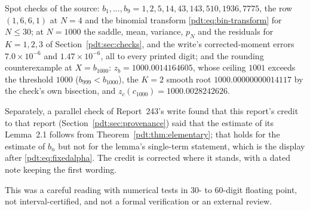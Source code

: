 Spot checks of the source: $b_1,\ldots,b_9=1,2,5,14,43,143,510,1936,7775$,
the row $(1,6,6,1)$ at $N=4$ and the binomial transform
\eqref{pdt:eq:bin-transform} for $N\le30$; at $N=1000$ the saddle, mean,
variance, $p_N$ and the residuals for $K=1,2,3$ of
Section~\ref{pdt:sec:checks}, and the write's corrected-moment errors
$7.0\times10^{-6}$ and $1.47\times10^{-6}$, all to every printed digit; and
the rounding counterexample at $X=b_{1000}$: $z_b=1000.0014164605$, whose
ceiling $1001$ exceeds the threshold $1000$ ($b_{999}<b_{1000}$), the $K=2$
smooth root $1000.00000000014117$ by the check's own bisection, and
$z_c(c_{1000})=1000.0028242626$.

Separately, a parallel check of Report~243's write found that this
report's credit to that report (Section~\ref{pdt:sec:provenance}) said
that the estimate of its Lemma~2.1 follows from
Theorem~\ref{pdt:thm:elementary}; that holds for the estimate of $b_n$
but not for the lemma's single-term statement, which is the display after
\eqref{pdt:eq:fixedalpha}. The credit is corrected where it stands, with a
dated note keeping the first wording.

This was a careful reading with numerical tests in 30- to 60-digit floating
point, not interval-certified, and not a formal verification or an
external review.
